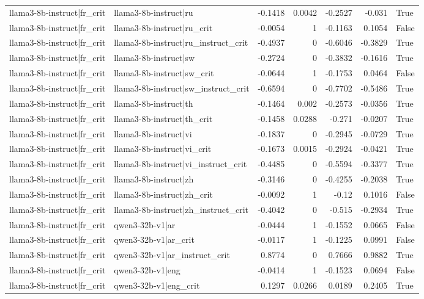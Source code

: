 \begin{table}
\begin{tabular}{l l r r r r l}
llama3-8b-instruct|fr_crit & llama3-8b-instruct|ru & -0.1418 & 0.0042 & -0.2527 & -0.031 & True \\
llama3-8b-instruct|fr_crit & llama3-8b-instruct|ru_crit & -0.0054 & 1 & -0.1163 & 0.1054 & False \\
llama3-8b-instruct|fr_crit & llama3-8b-instruct|ru_instruct_crit & -0.4937 & 0 & -0.6046 & -0.3829 & True \\
llama3-8b-instruct|fr_crit & llama3-8b-instruct|sw & -0.2724 & 0 & -0.3832 & -0.1616 & True \\
llama3-8b-instruct|fr_crit & llama3-8b-instruct|sw_crit & -0.0644 & 1 & -0.1753 & 0.0464 & False \\
llama3-8b-instruct|fr_crit & llama3-8b-instruct|sw_instruct_crit & -0.6594 & 0 & -0.7702 & -0.5486 & True \\
llama3-8b-instruct|fr_crit & llama3-8b-instruct|th & -0.1464 & 0.002 & -0.2573 & -0.0356 & True \\
llama3-8b-instruct|fr_crit & llama3-8b-instruct|th_crit & -0.1458 & 0.0288 & -0.271 & -0.0207 & True \\
llama3-8b-instruct|fr_crit & llama3-8b-instruct|vi & -0.1837 & 0 & -0.2945 & -0.0729 & True \\
llama3-8b-instruct|fr_crit & llama3-8b-instruct|vi_crit & -0.1673 & 0.0015 & -0.2924 & -0.0421 & True \\
llama3-8b-instruct|fr_crit & llama3-8b-instruct|vi_instruct_crit & -0.4485 & 0 & -0.5594 & -0.3377 & True \\
llama3-8b-instruct|fr_crit & llama3-8b-instruct|zh & -0.3146 & 0 & -0.4255 & -0.2038 & True \\
llama3-8b-instruct|fr_crit & llama3-8b-instruct|zh_crit & -0.0092 & 1 & -0.12 & 0.1016 & False \\
llama3-8b-instruct|fr_crit & llama3-8b-instruct|zh_instruct_crit & -0.4042 & 0 & -0.515 & -0.2934 & True \\
llama3-8b-instruct|fr_crit & qwen3-32b-v1|ar & -0.0444 & 1 & -0.1552 & 0.0665 & False \\
llama3-8b-instruct|fr_crit & qwen3-32b-v1|ar_crit & -0.0117 & 1 & -0.1225 & 0.0991 & False \\
llama3-8b-instruct|fr_crit & qwen3-32b-v1|ar_instruct_crit & 0.8774 & 0 & 0.7666 & 0.9882 & True \\
llama3-8b-instruct|fr_crit & qwen3-32b-v1|eng & -0.0414 & 1 & -0.1523 & 0.0694 & False \\
llama3-8b-instruct|fr_crit & qwen3-32b-v1|eng_crit & 0.1297 & 0.0266 & 0.0189 & 0.2405 & True \\

\end{tabular}
\end{table}
